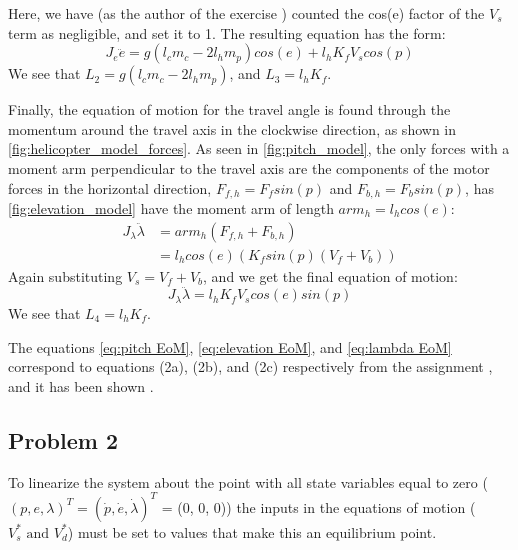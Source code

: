 %
Here, we have (as the author of the exercise \cite{assignment})
counted the cos(e) factor of the $V_s$ term as negligible, and set it
to 1. The resulting equation has the
form:
%
\begin{equation}
  \label{eq:elevation EoM}
  J_e\ddot{e} = g(l_cm_c - 2l_hm_p)cos(e) + l_hK_fV_scos(p)
\end{equation}
%
We see that $L_2 = g(l_cm_c-2l_hm_p)$, and $L_3 = l_hK_f$.

Finally, the equation of motion for the travel angle is found through
the momentum around the travel axis in the  clockwise direction, as
shown in \cref{fig:helicopter_model_forces}. As seen in
\cref{fig:pitch_model}, the only forces with a moment arm
perpendicular to the travel axis are the components of the motor
forces in the horizontal direction, $F_{f,h} = F_fsin(p)$ and $F_{b,h}
= F_bsin(p)$, has \cref{fig:elevation_model} have the moment arm of
length $arm_h = l_hcos(e)$:
%
\begin{align*}
  J_\lambda\ddot{\lambda} &= arm_h(F_{f,h} + F_{b,h}) \\
                         &= l_hcos(e)(K_fsin(p)(V_f + V_b))
\end{align*}
%
Again substituting $V_s = V_f + V_b$, and we get the final equation of motion:
%
\begin{equation}
  \label{eq:lambda EoM}
  J_\lambda\ddot{\lambda} = l_hK_fV_scos(e)sin(p)
\end{equation}
%
We see that $L_4 = l_hK_f$.

The equations \cref{eq:pitch EoM}, \cref{eq:elevation EoM}, and
\cref{eq:lambda EoM} correspond to equations (2a), (2b), and (2c)
respectively from the assignment \cite[p.13]{assignment}, and it has
been shown .
%
\subsection{Problem 2}
To linearize the system about the point with all state variables equal
to zero ($(p, e, \lambda)^T = (\dot{p},\dot{e},\dot{\lambda})^T $ = (0, 0, 0))
the inputs in the equations of motion ($V^{*}_{s} \text{ and }
V^{*}_{d}$) must be set to values that make this an equilibrium point.

